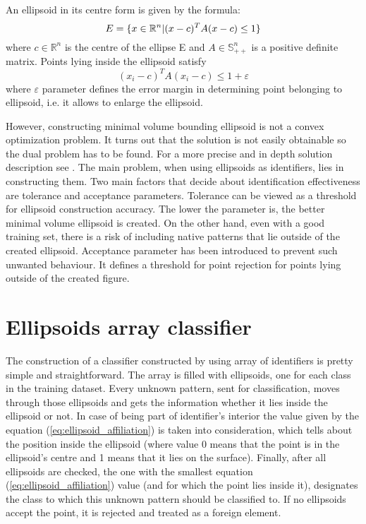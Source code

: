An ellipsoid in its centre form is given by the formula:
\vspace{-6pt} 
\[ 
\vspace{-3pt}
E = \{x \in \mathbb{R}^{n} | (x - c)^{T}A(x-c) \le 1\} 
\vspace{-3pt}
\] 
where $c \in \mathbb{R}^{n}$ is the centre of the ellipse E and $ A \in \mathbb{S}^{n}_{++}$ is a positive definite matrix. Points lying inside the ellipsoid satisfy 
\begin{equation}\label{eq:ellipsoid_affiliation}(x_{i} - c)^{T}A(x_{i} - c) \le 1 + \varepsilon\end{equation}
where $\varepsilon$ parameter defines the error margin in determining point belonging to ellipsoid, i.e. it allows to enlarge the ellipsoid.%

However, constructing minimal volume bounding ellipsoid is not a convex optimization problem. It turns out that the solution is not easily obtainable so the dual problem has to be found. For a more precise and in depth solution description see \cite{MVEEMichaelTodd2005}. The main problem, when using ellipsoids as identifiers, lies in constructing them. Two main factors that decide about identification effectiveness are tolerance and acceptance parameters. Tolerance can be viewed as a threshold for ellipsoid construction accuracy. The lower the parameter is, the better minimal volume ellipsoid is created. On the other hand, even with a good training set, there is a risk of including native patterns that lie outside of the created ellipsoid. Acceptance parameter has been introduced to prevent such unwanted behaviour. It defines a threshold for point rejection for points lying outside of the created figure.

\section{Ellipsoids array classifier}

The construction of a classifier constructed by using array of identifiers is pretty simple and straightforward. The array is filled with ellipsoids, one for each class in the training dataset. Every unknown pattern, sent for classification, moves through those ellipsoids and gets the information whether it lies inside the ellipsoid or not. In case of being part of identifier's interior the value given by the equation (\ref{eq:ellipsoid_affiliation}) is taken into consideration, which tells about the position inside the ellipsoid (where value 0 means that the point is in the ellipsoid's centre and 1 means that it lies on the surface). Finally, after all ellipsoids are checked, the one with the smallest equation (\ref{eq:ellipsoid_affiliation}) value (and for which the point lies inside it), designates the class to which this unknown pattern should be classified to. If no ellipsoids accept the point, it is rejected and treated as a foreign element.

